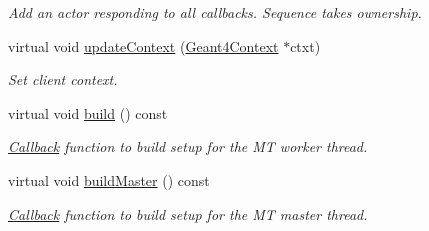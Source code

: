 \begin{DoxyCompactItemize}
\begin{DoxyCompactList}\small\item\em Add an actor responding to all callbacks. Sequence takes ownership. \end{DoxyCompactList}\item 
virtual void \hyperlink{class_d_d4hep_1_1_simulation_1_1_geant4_user_initialization_sequence_ae73630ce8b3759e3793dc58f585a291b}{update\+Context} (\hyperlink{class_d_d4hep_1_1_simulation_1_1_geant4_context}{Geant4\+Context} $\ast$ctxt)
\begin{DoxyCompactList}\small\item\em Set client context. \end{DoxyCompactList}\item 
virtual void \hyperlink{class_d_d4hep_1_1_simulation_1_1_geant4_user_initialization_sequence_a7805c4b772060132398bf2d02a83d4c2}{build} () const
\begin{DoxyCompactList}\small\item\em \hyperlink{class_d_d4hep_1_1_callback}{Callback} function to build setup for the MT worker thread. \end{DoxyCompactList}\item 
virtual void \hyperlink{class_d_d4hep_1_1_simulation_1_1_geant4_user_initialization_sequence_a7bcc884bce6a20d73e734777c0c75322}{build\+Master} () const
\begin{DoxyCompactList}\small\item\em \hyperlink{class_d_d4hep_1_1_callback}{Callback} function to build setup for the MT master thread. \end{DoxyCompactList}\end{DoxyCompactItemize}
